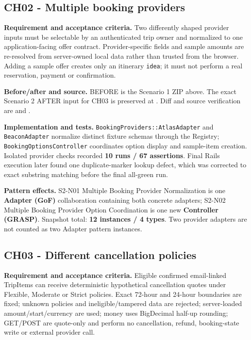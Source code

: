 \documentclass[11pt,a4paper]{article}
\renewcommand{\_}{\textunderscore\allowbreak}
\begin{document}
\subsection{CH02 - Multiple booking providers}
\textbf{Requirement and acceptance criteria.} Two differently shaped provider inputs must be selectable by an authenticated trip owner and normalized to one application-facing offer contract. Provider-specific fields and sample amounts are re-resolved from server-owned local data rather than trusted from the browser. Adding a sample offer creates only an itinerary \texttt{idea}; it must not perform a real reservation, payment or confirmation.

\textbf{Before/after and source.} BEFORE is the Scenario 1 ZIP above. The exact Scenario 2 AFTER input for CH03 is preserved at . Diff and source verification are  and .

\textbf{Implementation and tests.} \texttt{BookingProviders::AtlasAdapter} and \texttt{BeaconAdapter} normalize distinct fixture schemas through the Registry; \texttt{BookingOptionsController} coordinates option display and sample-item creation. Isolated provider checks recorded \textbf{10 runs / 67 assertions}. Final Rails execution later found one duplicate-marker lookup defect, which was corrected to exact substring matching before the final all-green run.

\textbf{Pattern effects.} S2-N01 Multiple Booking Provider Normalization is one \textbf{Adapter (GoF)} collaboration containing both concrete adapters; S2-N02 Multiple Booking Provider Option Coordination is one new \textbf{Controller (GRASP)}. Snapshot total: \textbf{12 instances / 4 types}. Two provider adapters are not counted as two Adapter pattern instances.

\subsection{CH03 - Different cancellation policies}
\textbf{Requirement and acceptance criteria.} Eligible confirmed email-linked TripItems can receive deterministic hypothetical cancellation quotes under Flexible, Moderate or Strict policies. Exact 72-hour and 24-hour boundaries are fixed; unknown policies and ineligible/tampered data are rejected; server-loaded amount/start/currency are used; money uses BigDecimal half-up rounding; GET/POST are quote-only and perform no cancellation, refund, booking-state write or external provider call.
\end{document}
